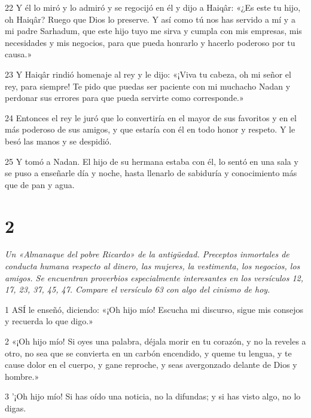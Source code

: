 \par 22 Y él lo miró y lo admiró y se regocijó en él y dijo a Haiqâr: «¿Es este tu hijo, oh Haiqâr? Ruego que Dios lo preserve. Y así como tú nos has servido a mí y a mi padre Sarhadum, que este hijo tuyo me sirva y cumpla con mis empresas, mis necesidades y mis negocios, para que pueda honrarlo y hacerlo poderoso por tu causa.»

\par 23 Y Haiqâr rindió homenaje al rey y le dijo: «¡Viva tu cabeza, oh mi señor el rey, para siempre! Te pido que puedas ser paciente con mi muchacho Nadan y perdonar sus errores para que pueda servirte como corresponde.»

\par 24 Entonces el rey le juró que lo convertiría en el mayor de sus favoritos y en el más poderoso de sus amigos, y que estaría con él en todo honor y respeto. Y le besó las manos y se despidió.

\par 25 Y tomó a Nadan. El hijo de su hermana estaba con él, lo sentó en una sala y se puso a enseñarle día y noche, hasta llenarlo de sabiduría y conocimiento más que de pan y agua.



\chapter{2}

\par \textit{Un «Almanaque del pobre Ricardo» de la antigüedad. Preceptos inmortales de conducta humana respecto al dinero, las mujeres, la vestimenta, los negocios, los amigos. Se encuentran proverbios especialmente interesantes en los versículos 12, 17, 23, 37, 45, 47. Compare el versículo 63 con algo del cinismo de hoy.}

\par 1 ASÍ le enseñó, diciendo: «¡Oh hijo mío! Escucha mi discurso, sigue mis consejos y recuerda lo que digo.»

\par 2 «¡Oh hijo mío! Si oyes una palabra, déjala morir en tu corazón, y no la reveles a otro, no sea que se convierta en un carbón encendido, y queme tu lengua, y te cause dolor en el cuerpo, y gane reproche, y seas avergonzado delante de Dios y hombre.»

\par 3 '¡Oh hijo mío! Si has oído una noticia, no la difundas; y si has visto algo, no lo digas.

